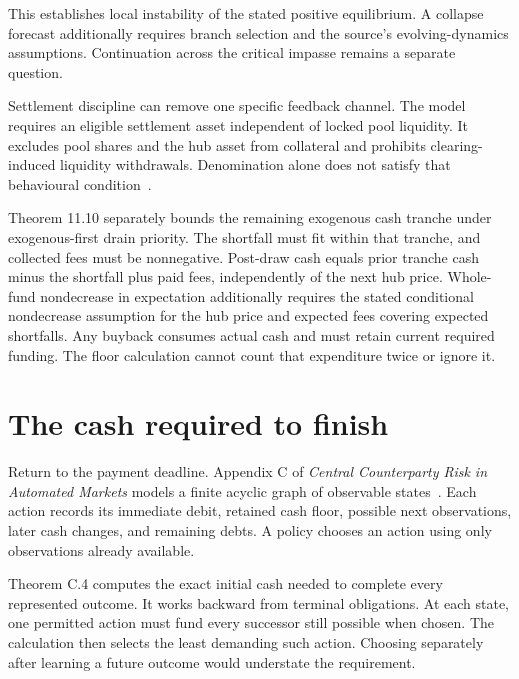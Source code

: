 \documentclass{momentum}
\begin{document}
This establishes local instability of the stated positive equilibrium. A collapse forecast additionally requires branch selection and the source's evolving-dynamics assumptions. Continuation across the critical impasse remains a separate question.

Settlement discipline can remove one specific feedback channel. The model requires an eligible settlement asset independent of locked pool liquidity. It excludes pool shares and the hub asset from collateral and prohibits clearing-induced liquidity withdrawals. Denomination alone does not satisfy that behavioural condition~\cite[\S11.1]{ccp}.

Theorem 11.10 separately bounds the remaining exogenous cash tranche under exogenous-first drain priority. The shortfall must fit within that tranche, and collected fees must be nonnegative. Post-draw cash equals prior tranche cash minus the shortfall plus paid fees, independently of the next hub price. Whole-fund nondecrease in expectation additionally requires the stated conditional nondecrease assumption for the hub price and expected fees covering expected shortfalls. Any buyback consumes actual cash and must retain current required funding. The floor calculation cannot count that expenditure twice or ignore it.

\section{The cash required to finish}

Return to the payment deadline. Appendix C of \emph{Central Counterparty Risk in Automated Markets} models a finite acyclic graph of observable states~\cite{ccp}. Each action records its immediate debit, retained cash floor, possible next observations, later cash changes, and remaining debts. A policy chooses an action using only observations already available.

Theorem C.4 computes the exact initial cash needed to complete every represented outcome. It works backward from terminal obligations. At each state, one permitted action must fund every successor still possible when chosen. The calculation then selects the least demanding such action. Choosing separately after learning a future outcome would understate the requirement.
\end{document}
